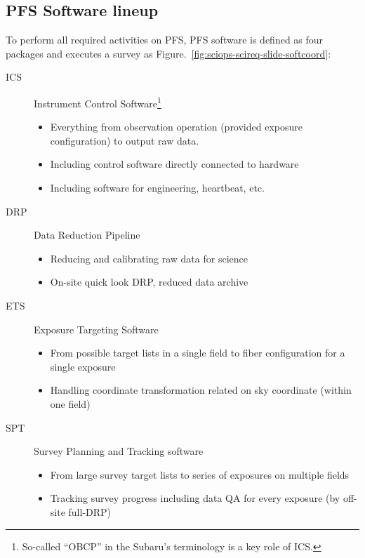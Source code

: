 \documentclass[a4paper,notitlepage]{article}
\begin{document}
\subsection{PFS Software lineup}

To perform all required activities on PFS, PFS software is defined as
four packages and executes a survey as
Figure.~\ref{fig:sciops-scireq-slide-softcoord}:
\begin{description}
 \item[ICS] Instrument Control Software\footnote{So-called ``OBCP'' in
        the Subaru's terminology is a key role of ICS.}
        \begin{itemize}
         \item Everything from observation operation (provided exposure
           configuration) to output raw data.
         \item Including control software directly connected to hardware
         \item Including software for engineering, heartbeat, etc.
        \end{itemize}
 \item[DRP] Data Reduction Pipeline
        \begin{itemize}
         \item Reducing and calibrating raw data for science
         \item On-site quick look DRP, reduced data archive
        \end{itemize}
 \item[ETS] Exposure Targeting Software
        \begin{itemize}
         \item From possible target lists in a single field to fiber
           configuration for a single exposure
         \item Handling coordinate transformation related on sky coordinate
           (within one field)
        \end{itemize}
 \item[SPT] Survey Planning and Tracking software
        \begin{itemize}
         \item From large survey target lists to series of exposures on
           multiple fields
         \item Tracking survey progress including data QA for every
           exposure (by off-site full-DRP)
        \end{itemize}
\end{description}
\end{document}
